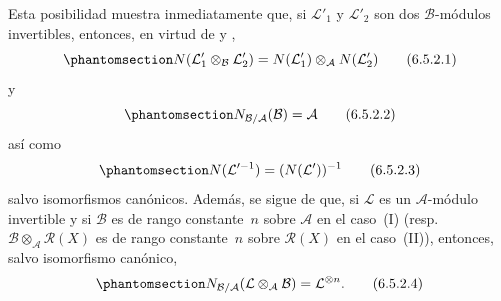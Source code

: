 \documentclass[oneside,10pt]{amsart}
\let\EGAOriginalLabel\label
\renewcommand{\label}[1]{\phantomsection\EGAOriginalLabel{#1}}
\begin{document}
\begin{env}[6.5.2]
Esta posibilidad muestra inmediatamente que, si $\mathcal{L}'_1$ y $\mathcal{L}'_2$ son dos $\mathcal{B}$-módulos invertibles, entonces, en virtud de  y ,
\[
\label{II.6.5.2.1-fr}
N(\mathcal{L}'_1\otimes_{\mathcal{B}}\mathcal{L}'_2)
=N(\mathcal{L}'_1)\otimes_{\mathcal{A}}N(\mathcal{L}'_2)
\tag{6.5.2.1}
\]
y
\[
\label{II.6.5.2.2-fr}
N_{\mathcal{B}/\mathcal{A}}(\mathcal{B})=\mathcal{A}
\tag{6.5.2.2}
\]
así como
\[
\label{II.6.5.2.3-fr}
N(\mathcal{L}'^{-1})=(N(\mathcal{L}'))^{-1}
\tag{6.5.2.3}
\]
salvo isomorfismos canónicos.
Además, se sigue de  que, si $\mathcal{L}$ es un $\mathcal{A}$-módulo invertible y si $\mathcal{B}$ es de rango constante~$n$ sobre $\mathcal{A}$ en el caso~(I) (resp. $\mathcal{B}\otimes_{\mathcal{A}}\mathcal{R}(X)$ es de rango constante~$n$ sobre $\mathcal{R}(X)$ en el caso~(II)), entonces, salvo isomorfismo canónico,
\[
\label{II.6.5.2.4-fr}
N_{\mathcal{B}/\mathcal{A}}(\mathcal{L}\otimes_{\mathcal{A}}\mathcal{B})
=\mathcal{L}^{\otimes n}.
\tag{6.5.2.4}
\]
\end{env}
\end{document}
